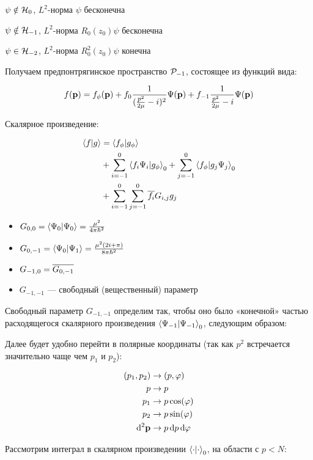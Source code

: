 $\psi \notin \mathcal{H}_{0}$, $L^2$-норма $\psi$ бесконечна

$\psi \notin \mathcal{H}_{-1}$, $L^2$-норма $R_0(z_0) \psi$ бесконечна

$\psi \in \mathcal{H}_{-2}$, $L^2$-норма $R_0^2(z_0) \psi$ конечна

Получаем предпонтрягинское пространство $\mathcal{P}_{-1}$, состоящее из функций вида:

\[
f(\vb{p}) = f_\phi(\vb{p}) + f_0 \frac{1}{(\frac{p^2}{2 \mu} - i)^2} \Psi(\vb{p}) + f_{-1} \frac{1}{\frac{p^2}{2 \mu} - i} \Psi(\vb{p})
\]

Скалярное произведение:

\begin{align*}
\ip{f}{g}
&= \ip{f_\phi}{g_\phi} \\
&+ \sum\limits_{i = -1}^0 \ip{f_i \Psi_i}{g_\phi}_0 + \sum\limits_{j = -1}^0 \ip{f_\phi}{g_j \Psi_j}_0 \\
&+ \sum\limits_{i = -1}^0 \sum \limits_{j = -1}^0 \cconj{f_i} G_{i,j} g_j 
\end{align*}

\begin{itemize}
\item $G_{0, 0} = \ip{\Psi_0}{\Psi_0} = \frac{\mu^2}{4 \pi \hbar^2}$
\item $G_{0, -1} = \ip{\Psi_0}{\Psi_1} = \frac{\mu^2 (2 i + \pi)}{8 \pi \hbar^2}$
\item $G_{-1, 0} = \overline{G_{0, -1}}$
\item $G_{-1, -1}$ — свободный (вещественный) параметр
\end{itemize}

Свободный параметр $G_{-1, -1}$ определим так, чтобы оно было «конечной» частью расходящегося скалярного произведения $\ip{\Psi_{-1}}{\Psi_{-1}}_0$, следующим образом:

Далее будет удобно перейти в полярные координаты (так как $p^2$ встречается значительно чаще чем $p_1$ и $p_2$):

\begin{align*}
(p_1, p_2) &\to (p, \varphi) \\
p &\to p \\
p_1 &\to p \cos(\varphi) \\
p_2 &\to p \sin(\varphi) \\
\dd[2]{\vb{p}} &\to p \dd{p} \dd{\varphi}
\end{align*}

Рассмотрим интеграл в скалярном произведении $\ip{\cdot}{\cdot}_0$, на области с $p < N$:

